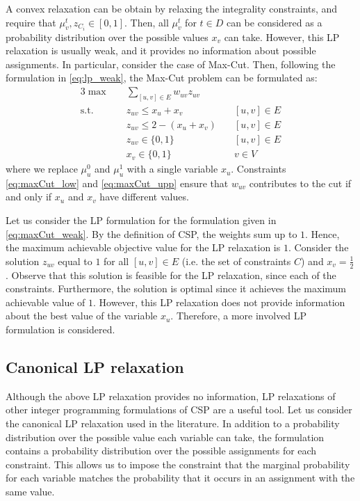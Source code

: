 A convex relaxation can be obtain by relaxing the integrality constraints, and require that $\mu_v^t, z_{C_i} \in [ 0,1]$. 
Then, all $\mu_v^t$ for $t \in D$ can be considered as a probability distribution over the possible values $x_v$ can take.
However, this LP relaxation is usually weak, and it provides no information about possible assignments. In particular, consider the case of Max-Cut. 
Then, following the formulation in \eqref{eq:lp_weak}, the Max-Cut problem can be formulated as:
\begin{alignat}{3}
\max \quad & \sum_{[u,v]\in E}w_{uv} z_{uv} & \label{eq:maxCut_weak}\\
\text{s.t.} \quad & z_{uv} \le x_u + x_v & \quad [u,v] \in E \label{eq:maxCut_low} \\
& z_{uv} \le 2 - ( x_u + x_v ) & \quad [u,v] \in E \label{eq:maxCut_upp}\\
& z_{uv} \in \{0,1\} & \quad [u,v] \in E \nonumber\\
&	x_v \in \{0,1\}	& \quad v \in  V \nonumber
\end{alignat}
where we replace $\mu_{u}^0$ and $\mu_u^1$ with a single variable $x_u$. 
Constraints \eqref{eq:maxCut_low} and \eqref{eq:maxCut_upp} ensure that $w_{uv}$ contributes to the cut if and only if $x_u$ and $x_v$ have different values.

Let us consider the LP formulation for the formulation given in \eqref{eq:maxCut_weak}. 
By the definition of CSP, the weights sum up to $1$. 
Hence, the maximum achievable objective value for the LP relaxation is $1$. 
Consider the solution $z_{uv}$ equal to $1$ for all $[u,v] \in E$ (i.e. the set of constraints $C$) and $x_v = \frac{1}{2}$. 
Observe that this solution is feasible for the LP relaxation, since each of the constraints. Furthermore, the solution is optimal since it achieves the maximum achievable value of $1$. 
However, this LP relaxation does not provide information about the best value of the variable $x_u$. 
Therefore, a more involved LP formulation is considered.

\subsection{Canonical LP relaxation}
Although the above LP relaxation provides no information, LP relaxations of other integer programming formulations of CSP are a useful tool.
Let us consider the canonical LP relaxation used in the literature.
In addition to a probability distribution over the possible value each variable can take, the formulation contains a probability distribution over the possible assignments for each constraint.
This allows us to impose the constraint that the marginal probability for each variable matches the probability that it occurs in an assignment with the same value.

